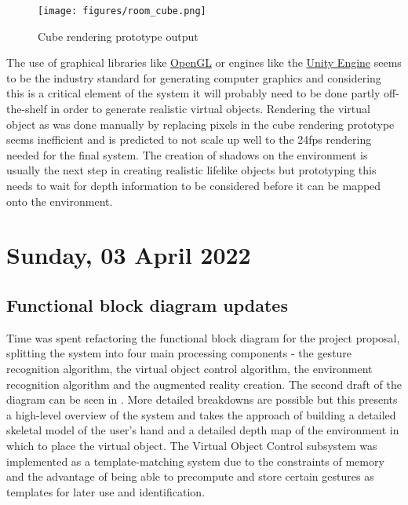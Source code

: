 \begin{figure}[!ht]
  \centering
  \texttt{[image: figures/room\_cube.png]}
  \caption{Cube rendering prototype output}
  \label{fig:room_cube}
\end{figure}

The use of graphical libraries like \href{https://www.opengl.org}{OpenGL} or engines like the \href{https://unity.com}{Unity Engine} seems to be the industry standard for generating computer graphics and considering this is a critical element of the system it will probably need to be done partly off-the-shelf in order to generate realistic virtual objects. Rendering the virtual object as was done manually by replacing pixels in the cube rendering prototype seems inefficient and is predicted to not scale up well to the 24fps rendering needed for the final system. The creation of shadows on the environment is usually the next step in creating realistic lifelike objects but prototyping this needs to wait for depth information to be considered before it can be mapped onto the environment. \newline

\section[2022/04/03]{Sunday, 03 April 2022}

\subsection{Functional block diagram updates}

Time was spent refactoring the functional block diagram for the project proposal, splitting the system into four main processing components - the gesture recognition algorithm, the virtual object control algorithm, the environment recognition algorithm and the augmented reality creation. The second draft of the diagram can be seen in . More detailed breakdowns are possible but this presents a high-level overview of the system and takes the approach of building a detailed skeletal model of the user's hand and a detailed depth map of the environment in which to place the virtual object. The Virtual Object Control subsystem was implemented as a template-matching system due to the constraints of memory and the advantage of being able to precompute and store certain gestures as templates for later use and identification. \newline

